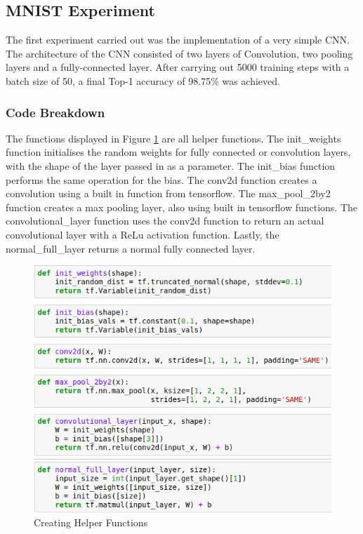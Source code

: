\documentclass[12pt]{report}
\begin{document}
\subsection{MNIST Experiment}

The first experiment carried out was the implementation of a very simple CNN. The architecture of the CNN consisted of two layers of Convolution, two pooling layers and a fully-connected layer. After carrying out 5000 training steps with a batch size of 50, a final Top-1 accuracy of 98.75\% was achieved.

\subsubsection*{Code Breakdown}

\begin{flushleft}
The functions displayed in Figure \ref{fig:helpers} are all helper functions. The init\_weights function initialises the random weights for fully connected or convolution layers, with the shape of the layer passed in as a parameter. The init\_bias function performs the same operation for the bias. The conv2d function creates a convolution using a built in function from tensorflow. The max\_pool\_2by2 function creates a max pooling layer, also using built in tensorflow functions. The convolutional\_layer function uses the conv2d function to return an actual convolutional layer with a ReLu activation function. Lastly, the normal\_full\_layer returns a normal fully connected layer.
\end{flushleft}

\vspace{0.5cm}
\begin{figure}[ht!]
	\centering
	\includegraphics[width=12cm]{helpers}
	\caption{Creating Helper Functions}
	\label{fig:helpers}
\end{figure}
\end{document}
